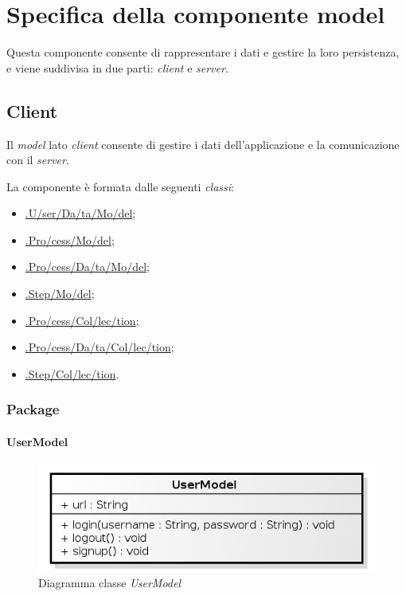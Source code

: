 \section{Specifica della componente model}

Questa componente consente di rappresentare i dati e gestire la loro persistenza, e viene suddivisa in due parti: \textit{client} e \textit{server}. 

\subsection{Client}

Il \textit{model} lato \textit{client} consente di gestire i dati dell'applicazione e la comunicazione con il \textit{server}.

La componente è formata dalle seguenti \textit{classi}:
\begin{itemize}
	\item \hyperref[userDataModel]{\model{}.U\fshyp{}ser\fshyp{}Da\fshyp{}ta\fshyp{}Mo\fshyp{}del};
	\item \hyperref[processModel]{\model{}.Pro\fshyp{}cess\fshyp{}Mo\fshyp{}del};
	\item \hyperref[processDataModel]{\model{}.Pro\fshyp{}cess\fshyp{}Da\fshyp{}ta\fshyp{}Mo\fshyp{}del};
	\item \hyperref[stepModel]{\model{}.Step\fshyp{}Mo\fshyp{}del};
	\item \hyperref[processCollection]{\collection{}.Pro\fshyp{}cess\fshyp{}Col\fshyp{}lec\fshyp{}tion};
	\item \hyperref[processDataCollection]{\model{}.Pro\fshyp{}cess\fshyp{}Da\fshyp{}ta\fshyp{}Col\fshyp{}lec\fshyp{}tion};
	\item \hyperref[stepCollection]{\collection{}.Step\fshyp{}Col\fshyp{}lec\fshyp{}tion}.
\end{itemize}

\subsubsection{Package \model{}}

\paragraph{UserModel}
\label{userDataModel}

\begin{figure}[H] \centering \includegraphics[width=%
\textwidth]
{./classi/client/model/UserModel.png} \caption{Diagramma classe  \textit{UserModel}}
\end{figure}

